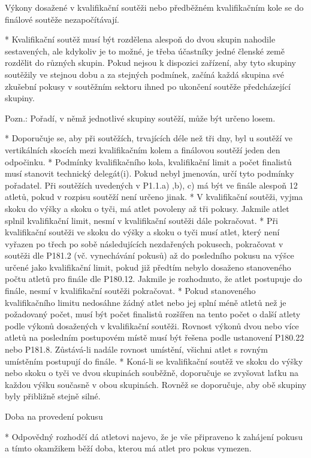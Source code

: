 Výkony dosažené v kvalifikační soutěži nebo předběžném kvalifikačním kole se do finálové soutěže nezapočítávají.

* Kvalifikační soutěž musí být rozdělena alespoň do dvou skupin nahodile sestavených, ale kdykoliv je to možné, je třeba účastníky jedné členské země rozdělit do různých skupin. Pokud nejsou k dispozici zařízení, aby tyto skupiny soutěžily ve stejnou dobu a za stejných podmínek, začíná každá skupina své zkušební pokusy v soutěžním sektoru ihned po ukončení soutěže předcházející skupiny.

Pozn.: Pořadí, v němž jednotlivé skupiny soutěží, může být určeno losem.

* Doporučuje se, aby při soutěžích, trvajících déle než tři dny, byl u soutěží ve vertikálních skocích mezi kvalifikačním kolem a finálovou soutěží jeden den odpočinku.
* Podmínky kvalifikačního kola, kvalifikační limit a počet finalistů musí stanovit technický delegát(i). Pokud nebyl jmenován, určí tyto podmínky pořadatel. Při soutěžích uvedených v P1.1.a) ,b), c) má být ve finále alespoň 12 atletů, pokud v rozpisu soutěží není určeno jinak.
* V kvalifikační soutěži, vyjma skoku do výšky a skoku o tyči, má atlet povoleny až tři pokusy. Jakmile atlet splnil kvalifikační limit, nesmí v kvalifikační soutěži dále pokračovat.
* Při kvalifikační soutěži ve skoku do výšky a skoku o tyči musí atlet, který není vyřazen po třech po sobě následujících nezdařených pokusech, pokračovat v soutěži dle P181.2 (vč. vynechávání pokusů) až do posledního pokusu na výšce určené jako kvalifikační limit, pokud již předtím nebylo dosaženo stanoveného počtu atletů pro finále dle P180.12. Jakmile je rozhodnuto, že atlet postupuje do finále, nesmí v kvalifikační soutěži pokračovat.
* Pokud stanoveného kvalifikačního limitu nedosáhne žádný atlet nebo jej splní méně atletů než je požadovaný počet, musí být počet finalistů rozšířen na tento počet o další atlety podle výkonů dosažených v kvalifikační soutěži. Rovnost výkonů dvou nebo více atletů na posledním postupovém místě musí být řešena podle ustanovení P180.22 nebo P181.8. Zůstává-li nadále rovnost umístění, všichni atlet s rovným umístěním postupují do finále.
* Koná-li se kvalifikační soutěž ve skoku do výšky nebo skoku o tyči ve dvou skupinách souběžně, doporučuje se zvyšovat laťku na každou výšku současně v obou skupinách. Rovněž se doporučuje, aby obě skupiny byly přibližně stejně silné.

Doba na provedení pokusu

* Odpovědný rozhodčí dá atletovi najevo, že je vše připraveno k zahájení pokusu a tímto okamžikem běží doba, kterou má atlet pro pokus vymezen.

